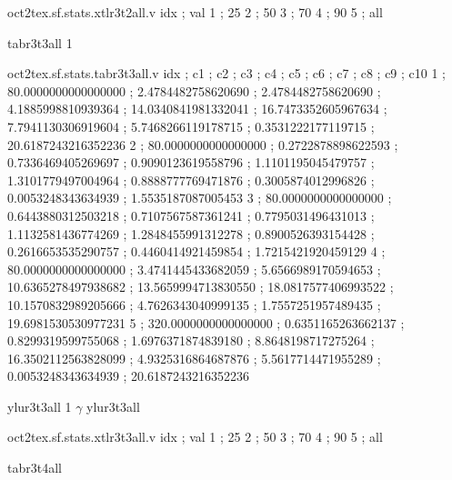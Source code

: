 \begin{filecontents}[overwrite]{oct2tex.sf.stats.xtlr3t2all.v}
idx ; val
1 ; 25
2 ; 50
3 ; 70
4 ; 90
5 ; all
\end{filecontents}
\expandafter\def\csname oct2tex.sf.stats.tabr3t3all.t\endcsname{tabr3t3all}
\expandafter\def\csname oct2tex.sf.stats.tabr3t3all.u\endcsname{1}
\begin{filecontents}[overwrite]{oct2tex.sf.stats.tabr3t3all.v}
idx ; c1 ; c2 ; c3 ; c4 ; c5 ; c6 ; c7 ; c8 ; c9 ; c10
1 ; 80.0000000000000000 ; 2.4784482758620690 ; 2.4784482758620690 ; 4.1885998810939364 ; 14.0340841981332041 ; 16.7473352605967634 ; 7.7941130306919604 ; 5.7468266119178715 ; 0.3531222177119715 ; 20.6187243216352236
2 ; 80.0000000000000000 ; 0.2722878898622593 ; 0.7336469405269697 ; 0.9090123619558796 ; 1.1101195045479757 ; 1.3101779497004964 ; 0.8888777769471876 ; 0.3005874012996826 ; 0.0053248343634939 ; 1.5535187087005453
3 ; 80.0000000000000000 ; 0.6443880312503218 ; 0.7107567587361241 ; 0.7795031496431013 ; 1.1132581436774269 ; 1.2848455991312278 ; 0.8900526393154428 ; 0.2616653535290757 ; 0.4460414921459854 ; 1.7215421920459129
4 ; 80.0000000000000000 ; 3.4741445433682059 ; 5.6566989170594653 ; 10.6365278497938682 ; 13.5659994713830550 ; 18.0817577406993522 ; 10.1570832989205666 ; 4.7626343040999135 ; 1.7557251957489435 ; 19.6981530530977231
5 ; 320.0000000000000000 ; 0.6351165263662137 ; 0.8299319599755068 ; 1.6976371874839180 ; 8.8648198717275264 ; 16.3502112563828099 ; 4.9325316864687876 ; 5.5617714471955289 ; 0.0053248343634939 ; 20.6187243216352236
\end{filecontents}
\expandafter\def\csname oct2tex.sf.stats.ylur3t3all.t\endcsname{ylur3t3all}
\expandafter\def\csname oct2tex.sf.stats.ylur3t3all.u\endcsname{1}
\expandafter\def\csname oct2tex.sf.stats.ylur3t3all.v\endcsname{$\gamma$}
\expandafter\def\csname oct2tex.sf.stats.xtlr3t3all.t\endcsname{ylur3t3all}
\begin{filecontents}[overwrite]{oct2tex.sf.stats.xtlr3t3all.v}
idx ; val
1 ; 25
2 ; 50
3 ; 70
4 ; 90
5 ; all
\end{filecontents}
\expandafter\def\csname oct2tex.sf.stats.tabr3t4all.t\endcsname{tabr3t4all}
